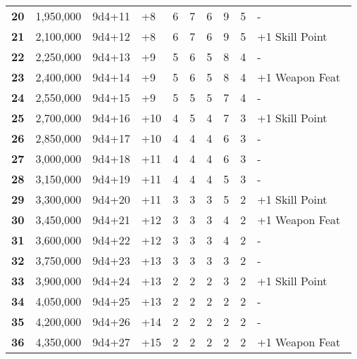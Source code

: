 \begin {table}[H]
\begin{tabularx}{\columnwidth}{>{\bfseries}cccM{.31in}M{.51in}M{.25in}M{.43in}M{.32in}M{.45in}Y}
		20 & 1,950,000 & 9d4+11 & +8 & 6 & 7 & 6 & 9 & 5 & -\\
		21 & 2,100,000 & 9d4+12 & +8 & 6 & 7 & 6 & 9 & 5 & +1 Skill Point\\
		22 & 2,250,000 & 9d4+13 & +9 & 5 & 6 & 5 & 8 & 4 & -\\
		23 & 2,400,000 & 9d4+14 & +9 & 5 & 6 & 5 & 8 & 4 & +1 Weapon Feat\\
		24 & 2,550,000 & 9d4+15 & +9 & 5 & 5 & 5 & 7 & 4 & -\\
		25 & 2,700,000 & 9d4+16 & +10 & 4 & 5 & 4 & 7 & 3 & +1 Skill Point\\
		26 & 2,850,000 & 9d4+17 & +10 & 4 & 4 & 4 & 6 & 3 & -\\
		27 & 3,000,000 & 9d4+18 & +11 & 4 & 4 & 4 & 6 & 3 & -\\
		28 & 3,150,000 & 9d4+19 & +11 & 4 & 4 & 4 & 5 & 3 & -\\
		29 & 3,300,000 & 9d4+20 & +11 & 3 & 3 & 3 & 5 & 2 & +1 Skill Point\\
		30 & 3,450,000 & 9d4+21 & +12 & 3 & 3 & 3 & 4 & 2 & +1 Weapon Feat\\
		31 & 3,600,000 & 9d4+22 & +12 & 3 & 3 & 3 & 4 & 2 & -\\
		32 & 3,750,000 & 9d4+23 & +13 & 3 & 3 & 3 & 3 & 2 & -\\
		33 & 3,900,000 & 9d4+24 & +13 & 2 & 2 & 2 & 3 & 2 & +1 Skill Point\\
		34 & 4,050,000 & 9d4+25 & +13 & 2 & 2 & 2 & 2 & 2 & -\\
		35 & 4,200,000 & 9d4+26 & +14 & 2 & 2 & 2 & 2 & 2 & -\\
		36 & 4,350,000 & 9d4+27 & +15 & 2 & 2 & 2 & 2 & 2 & +1 Weapon Feat\
  \end {tabularx}
\end {table}
\newpage
